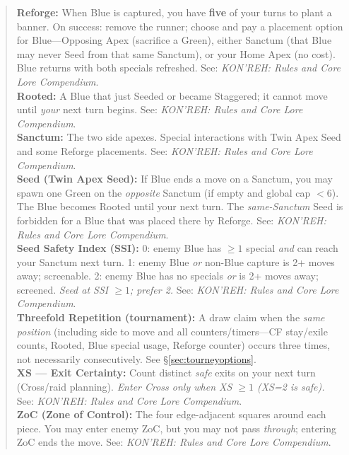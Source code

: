 \documentclass[11pt]{article}
\begin{document}
\begin{quote}
\textbf{Reforge:} When Blue is captured, you have \textbf{five} of your turns to plant a banner. On success: remove the runner; choose and pay a placement option for Blue—Opposing Apex (sacrifice a Green), either Sanctum (that Blue may never Seed from that same Sanctum), or your Home Apex (no cost). Blue returns with both specials refreshed. See: \textit{KON’REH: Rules and Core Lore Compendium}.\\

\textbf{Rooted:} A Blue that just Seeded or became Staggered; it cannot move until \emph{your} next turn begins. See: \textit{KON’REH: Rules and Core Lore Compendium}.\\

\textbf{Sanctum:} The two side apexes. Special interactions with Twin Apex Seed and some Reforge placements. See: \textit{KON’REH: Rules and Core Lore Compendium}.\\

\textbf{Seed (Twin Apex Seed):} If Blue ends a move on a Sanctum, you may spawn one Green on the \emph{opposite} Sanctum (if empty and global cap $<6$). The Blue becomes Rooted until your next turn. The \emph{same-Sanctum} Seed is forbidden for a Blue that was placed there by Reforge. See: \textit{KON’REH: Rules and Core Lore Compendium}.\\

\textbf{Seed Safety Index (SSI):} 0: enemy Blue has $\ge1$ special \emph{and} can reach your Sanctum next turn. 1: enemy Blue \emph{or} non-Blue capture is 2+ moves away; screenable. 2: enemy Blue has no specials \emph{or} is 2+ moves away; screened. \emph{Seed at SSI $\ge1$; prefer 2.} See: \textit{KON’REH: Rules and Core Lore Compendium}.\\

\textbf{Threefold Repetition (tournament):} A draw claim when the \emph{same position} (including side to move and all counters/timers—CF stay/exile counts, Rooted, Blue special usage, Reforge counter) occurs three times, not necessarily consecutively. See \S\ref{sec:tourneyoptions}.\\

\textbf{XS — Exit Certainty:} Count distinct \emph{safe} exits on your next turn (Cross/raid planning). \emph{Enter Cross only when XS $\ge1$ (XS=2 is safe).} See: \textit{KON’REH: Rules and Core Lore Compendium}.\\

\textbf{ZoC (Zone of Control):} The four edge-adjacent squares around each piece. You may enter enemy ZoC, but you may not pass \emph{through}; entering ZoC ends the move. See: \textit{KON’REH: Rules and Core Lore Compendium}.\\


\end{quote}
\end{document}
